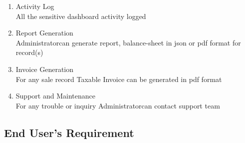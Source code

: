 \documentclass{scrreprt}
\def\admin{Administrator}
\def\user{End User}
\begin{document}
\begin{enumerate}[start=1,label={\bfseries REQ \arabic*:}]
	\item Activity Log
		\\All the sensitive dashboard activity logged 
	\item Report Generation
		\\ \admin \space can generate report, balance-sheet in json or pdf format for record(s)
	\item Invoice Generation
		\\For any sale record Taxable Invoice can be generated in pdf format
	\item Support and Maintenance
		\\For any trouble or inquiry \admin \space can contact support team
	
\end{enumerate}
\subsection{\user's Requirement}
\end{document}
